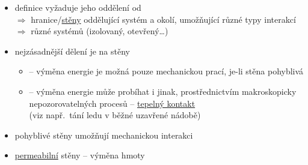 \begin{itemize}
  \item definice  vyžaduje jeho oddělení od  \\
        $\Rightarrow$ hranice/\underline{stěny} oddělující systém a okolí, umožňující různé typy interakcí $\Rightarrow$ různé  systémů (izolovaný, otevřený\dots)
  \item nejzásadnější dělení je na stěny
  \begin{itemize}
    \item[]  -- výměna energie je možná pouze mechanickou prací, je-li stěna pohyblivá
    \item[]   -- výměna energie může probíhat i jinak, prostřednictvím makroskopicky nepozorovatelných procesů -- \underline{tepelný kontakt} \\
            (viz např.\ tání ledu v běžné uzavřené nádobě)
  \end{itemize}
  \item pohyblivé stěny umožňují mechanickou interakci
  \item \underline{permeabilní} stěny -- výměna hmoty
\end{itemize}

